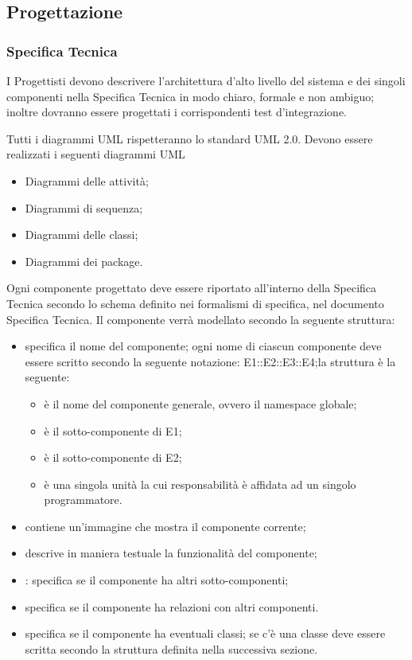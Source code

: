 \subsection{Progettazione}
\label{}
\subsubsection{Specifica Tecnica}
\label{}
I Progettisti devono descrivere l'architettura d'alto livello del sistema e dei singoli componenti nella Specifica Tecnica in modo chiaro, formale e non ambiguo; inoltre dovranno essere progettati i corrispondenti test d'integrazione.

\label{}
Tutti i diagrammi UML rispetteranno lo standard UML 2.0.
Devono essere realizzati i seguenti diagrammi UML
\begin{itemize}
\item Diagrammi delle attività;
\item Diagrammi di sequenza;
\item Diagrammi delle classi;
\item Diagrammi dei package.
\end{itemize}

\label{}
Ogni componente progettato deve essere riportato all'interno della Specifica Tecnica secondo lo schema definito nei formalismi di specifica, nel documento Specifica Tecnica. Il componente verrà modellato secondo la seguente struttura:
\begin{itemize}
\item {}specifica il nome del componente; ogni nome di ciascun componente deve essere scritto secondo la seguente notazione: E1::E2::E3::E4;la struttura è la seguente: 
\begin{itemize}
\item {}è il nome del componente generale, ovvero il namespace globale;
\item {}è il sotto-componente di E1;
\item {}è il sotto-componente di E2;
\item {}è una singola unità la cui responsabilità è affidata ad un singolo programmatore.  
\end{itemize}
\item {}contiene un'immagine che mostra il componente corrente;
\item {}descrive in maniera testuale la funzionalità del componente;
\item {}: specifica se il componente ha altri sotto-componenti;
\item {} specifica se il componente ha relazioni con altri componenti.
\item {}specifica se il componente ha eventuali classi; se c'è una classe deve essere scritta secondo la struttura definita nella successiva sezione.
\end{itemize}

